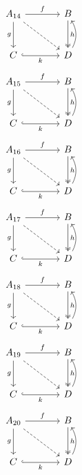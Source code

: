 \documentclass{article}
\begin{document}
\begin{equation}\begin{tikzcd}[column sep=large,row sep=large]
A_{14} \arrow[r,"f"] \arrow[d,"g"'] \arrow[dr,dashed] & B \arrow[d,two heads,"h"] \\ C \arrow[r,"k"',hook] & D \arrow[u,bend right]
\end{tikzcd}\end{equation}
\begin{equation}\begin{tikzcd}[column sep=large,row sep=large]
A_{15} \arrow[r,"f"] \arrow[d,"g"'] \arrow[dr,dashed] & B \arrow[d,two heads,"h"] \\ C \arrow[r,"k"',hook] & D \arrow[u,bend right]
\end{tikzcd}\end{equation}
\begin{equation}\begin{tikzcd}[column sep=large,row sep=large]
A_{16} \arrow[r,"f"] \arrow[d,"g"'] \arrow[dr,dashed] & B \arrow[d,two heads,"h"] \\ C \arrow[r,"k"',hook] & D \arrow[u,bend right]
\end{tikzcd}\end{equation}
\begin{equation}\begin{tikzcd}[column sep=large,row sep=large]
A_{17} \arrow[r,"f"] \arrow[d,"g"'] \arrow[dr,dashed] & B \arrow[d,two heads,"h"] \\ C \arrow[r,"k"',hook] & D \arrow[u,bend right]
\end{tikzcd}\end{equation}
\begin{equation}\begin{tikzcd}[column sep=large,row sep=large]
A_{18} \arrow[r,"f"] \arrow[d,"g"'] \arrow[dr,dashed] & B \arrow[d,two heads,"h"] \\ C \arrow[r,"k"',hook] & D \arrow[u,bend right]
\end{tikzcd}\end{equation}
\begin{equation}\begin{tikzcd}[column sep=large,row sep=large]
A_{19} \arrow[r,"f"] \arrow[d,"g"'] \arrow[dr,dashed] & B \arrow[d,two heads,"h"] \\ C \arrow[r,"k"',hook] & D \arrow[u,bend right]
\end{tikzcd}\end{equation}
\begin{equation}\begin{tikzcd}[column sep=large,row sep=large]
A_{20} \arrow[r,"f"] \arrow[d,"g"'] \arrow[dr,dashed] & B \arrow[d,two heads,"h"] \\ C \arrow[r,"k"',hook] & D \arrow[u,bend right]
\end{tikzcd}\end{equation}
\end{document}
